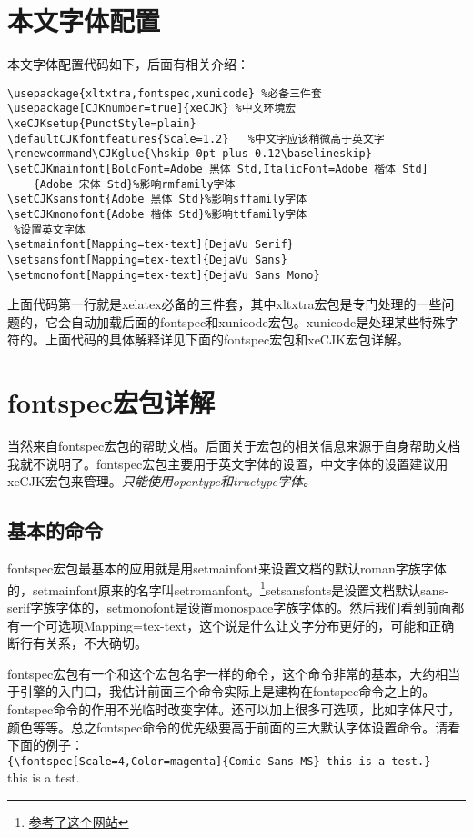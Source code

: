 \section{本文字体配置}
本文字体配置代码如下，后面有相关介绍：
\begin{verbatim}
\usepackage{xltxtra,fontspec,xunicode} %必备三件套
\usepackage[CJKnumber=true]{xeCJK} %中文环境宏
\xeCJKsetup{PunctStyle=plain}
\defaultCJKfontfeatures{Scale=1.2}   %中文字应该稍微高于英文字
\renewcommand\CJKglue{\hskip 0pt plus 0.12\baselineskip} 
\setCJKmainfont[BoldFont=Adobe 黑体 Std,ItalicFont=Adobe 楷体 Std]
    {Adobe 宋体 Std}%影响rmfamily字体
\setCJKsansfont{Adobe 黑体 Std}%影响sffamily字体
\setCJKmonofont{Adobe 楷体 Std}%影响ttfamily字体
 %设置英文字体
\setmainfont[Mapping=tex-text]{DejaVu Serif} 
\setsansfont[Mapping=tex-text]{DejaVu Sans}
\setmonofont[Mapping=tex-text]{DejaVu Sans Mono}
\end{verbatim}

上面代码第一行就是xelatex必备的三件套，其中xltxtra宏包是专门处理\XeLaTeX 的一些问题的，它会自动加载后面的fontspec和xunicode宏包。xunicode是处理某些特殊字符的。上面代码的具体解释详见下面的fontspec宏包和xeCJK宏包详解。


\section{fontspec宏包详解}
当然来自fontspec宏包的帮助文档。后面关于宏包的相关信息来源于自身帮助文档我就不说明了。fontspec宏包主要用于英文字体的设置，中文字体的设置建议用xeCJK宏包来管理。\emph{\XeLaTeX 只能使用opentype和truetype字体。}

\subsection{基本的命令}
fontspec宏包最基本的应用就是用setmainfont来设置文档的默认roman字族字体的，setmainfont原来的名字叫setromanfont。\footnote{\href{http://tex.stackexchange.com/questions/70413/problem-with-xetex-latex-and-system-fonts}{参考了这个网站}}setsansfonts是设置文档默认sans-serif字族字体的，setmonofont是设置monospace字族字体的。然后我们看到前面都有一个可选项Mapping=tex-text，这个说是什么让\XeTeX 文字分布更好的，可能和正确断行有关系，不大确切。

fontspec宏包有一个和这个宏包名字一样的命令，这个命令非常的基本，大约相当于引擎的入门口，我估计前面三个命令实际上是建构在fontspec命令之上的。fontspec命令的作用不光临时改变字体。还可以加上很多可选项，比如字体尺寸，颜色等等。总之fontspec命令的优先级要高于前面的三大默认字体设置命令。请看下面的例子：\\
\verb+{\fontspec[Scale=4,Color=magenta]{Comic Sans MS} this is a test.} +\\
{ this is a test.} 

